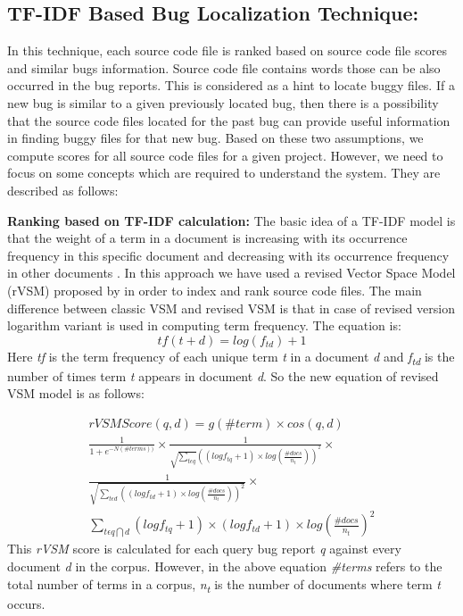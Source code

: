 \documentclass[conference]{IEEEtran}
\begin{document}
\subsection{TF-IDF Based Bug Localization Technique:}
In this technique, each source code file is ranked based on source code file scores and similar bugs information. Source code file contains words those can be also occurred in the bug reports. This is considered as a hint to locate buggy files. If a new bug is similar to a given previously located bug, then there is a possibility that the source code files located for the past bug can provide useful information in finding buggy files for that new bug. Based on these two assumptions, we compute scores for all source code files for a given project. However, we need to focus on some concepts which are required to understand the  system. They are described as follows:

\textbf{Ranking based on TF-IDF calculation:}
The basic idea of a TF-IDF model is that the weight of a term in a document is increasing with its occurrence frequency in this specific document and decreasing with its occurrence frequency in other documents \cite{Jian}.
In this approach we have used a revised Vector Space Model (rVSM) proposed by \citet{Jian} in order to index and rank source code files. 
The main difference between classic VSM and revised VSM is that in case of revised version logarithm variant is used in computing term frequency. The equation is:
\begin{equation}
tf(t+d)=log(f_{td})+1
\end{equation}
Here \textit{tf} is the term frequency of each unique term \textit{t} in a document \textit{d} and \textit{f\textsubscript{td}} is the number of times term \textit{t} appears in document \textit{d}.
So the new equation of revised VSM model is as follows:

\begin{multline}\label{rVSMequation}
rVSMScore(q,d)=g(\#term)\times cos(q,d)
\\
\frac{1}{1+e^{-N(\#terms))}}\times \frac{1}{\sqrt{\sum_{t\epsilon q}}((logf_{tq}+1)\times log(\frac{\#docs}{n_{t}}))^{^{2}}}\times 
\\
\frac{1}{\sqrt{\sum_{t\epsilon d}((log {f_{td}+1})\times log(\frac{\#docs}{n_{t}}))^{2}}}\times
\\
\sum_{t\epsilon q\bigcap d}(logf_{tq}+1)\times (logf_{td}+1)\times log(\frac{\#docs}{n_{t}})^{2}
\end{multline}
This \textit{rVSM} score is calculated for each query bug report \textit{q} against every document \textit{d} in the corpus. However, in the above equation \textit{\#terms} refers to the total number of terms in a corpus, \textit{n\textsubscript{t}} is the number of documents where term \textit{t} occurs.
\end{document}
